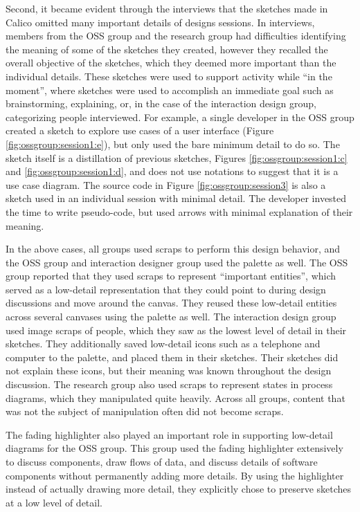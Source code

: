 Second, it became evident through the interviews that the sketches made in Calico omitted many important details of designs sessions. In interviews, members from the OSS group and the research group had difficulties identifying the meaning of some of the sketches they created, however they recalled the overall objective of the sketches, which they deemed more important than the individual details. These sketches were used to support activity while ``in the moment'', where sketches were used to accomplish an immediate goal such as brainstorming, explaining, or, in the case of the interaction design group, categorizing people interviewed. For example, a single developer in the OSS group created a sketch to explore use cases of a user interface (Figure \ref{fig:ossgroup:session1:e}), but only used the bare minimum detail to do so. The sketch itself is a distillation of previous sketches, Figures \ref{fig:ossgroup:session1:c} and \ref{fig:ossgroup:session1:d}, and does not use notations to suggest that it is a use case diagram. The source code in Figure \ref{fig:ossgroup:session3} is also a sketch used in an individual session with minimal detail. The developer invested the time to write pseudo-code, but used arrows with minimal explanation of their meaning. 

In the above cases, all groups used scraps to perform this design behavior, and the OSS group and interaction designer group used the palette as well. The OSS group reported that they used scraps to represent ``important entities'', which served as a low-detail representation that they could point to during design discussions and move around the canvas. They reused these low-detail entities across several canvases using the palette as well. The interaction design group used image scraps of people, which they saw as the lowest level of detail in their sketches. They additionally saved low-detail icons such as a telephone and computer to the palette, and placed them in their sketches. Their sketches did not explain these icons, but their meaning was known throughout the design discussion. The research group also used scraps to represent states in process diagrams, which they manipulated quite heavily. Across all groups, content that was not the subject of manipulation often did not become scraps.

The fading highlighter also played an important role in supporting low-detail diagrams for the OSS group. This group used the fading highlighter extensively to discuss components, draw flows of data, and discuss details of software components without permanently adding more details. By using the highlighter instead of actually drawing more detail, they explicitly chose to preserve sketches at a low level of detail.

